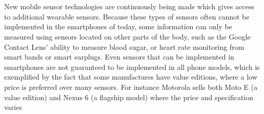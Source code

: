 \\\\
New mobile sensor technologies are continuously being made which gives access to additional wearable sensors. Because these types of sensors often cannot be implemented in the smartphones of today, some information can only be measured using sensors located on other parts of the body, such as the Google Contact Lens' ability to measure blood sugar, or heart rate monitoring from smart bands or smart earplugs. Even sensors that can be implemented in smartphones are not guaranteed to be implemented in all phone models, which is exemplified by the fact that some manufactures have value editions, where a low price is preferred over many sensors. For instance Motorola sells both Moto E (a value edition) and Nexus 6 (a flagship model) where the price and specification varies \parencite{moto_e_compared_to_nexus_6}

